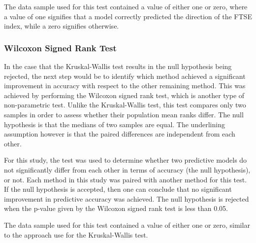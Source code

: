 \documentclass{UoYCSproject}
\begin{document}
The data sample used for this test contained a value of either one or zero, where a value of one signifies that a model correctly predicted the direction of the FTSE index, while a zero signifies otherwise.
 

\subsubsection{Wilcoxon Signed Rank Test} 
\label{sec:wilcoxon}
In the case that the Kruskal-Wallis test results in the null hypothesis being rejected, the next step would be to identify which method achieved a significant improvement in accuracy with respect to the other remaining method. This was achieved by performing the Wilcoxon signed rank test, which is another type of non-parametric test. Unlike the Kruskal-Wallis test, this test compares only two samples in order to assess whether their population mean ranks differ. The null hypothesis is that the medians of two samples are equal. The underlining assumption however is that the paired differences are independent from each other.

For this study, the test was used to determine whether two predictive models do not significantly differ from each other in terms of accuracy (the null hypothesis), or not. Each method in this study was paired with another method for this test. If the null hypothesis is accepted, then one can conclude that no significant improvement in predictive accuracy was achieved. The null hypothesis is rejected when the p-value given by the Wilcoxon signed rank test is less than 0.05.

The data sample used for this test contained a value of either one or zero, similar to the approach use for the Kruskal-Wallis test.
\end{document}
